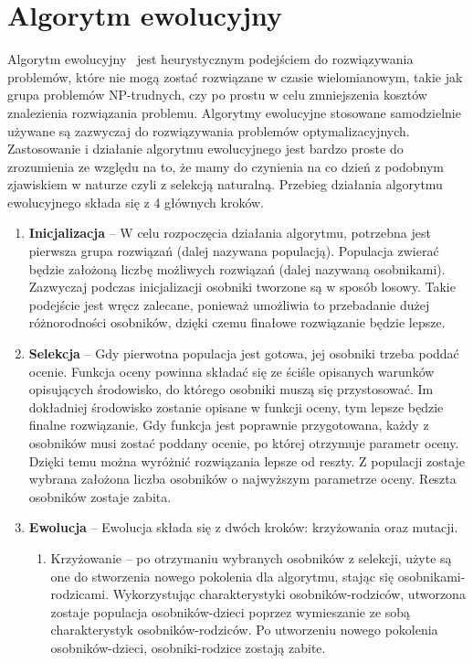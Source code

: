 \section{Algorytm ewolucyjny}
Algorytm ewolucyjny~\cite{evolution_algorithm} jest heurystycznym podejściem do rozwiązywania problemów, które nie mogą zostać rozwiązane w czasie wielomianowym, takie jak grupa problemów NP-trudnych, czy po prostu w celu zmniejszenia kosztów znalezienia rozwiązania problemu. Algorytmy ewolucyjne stosowane samodzielnie używane są zazwyczaj do rozwiązywania problemów optymalizacyjnych. Zastosowanie i działanie algorytmu ewolucyjnego jest bardzo proste do zrozumienia ze względu na to, że mamy do czynienia na co dzień z podobnym zjawiskiem w naturze czyli z selekcją naturalną. Przebieg działania algorytmu ewolucyjnego składa się z 4 głównych kroków.
	\begin{enumerate}
	\item \textbf{Inicjalizacja} -- W celu rozpoczęcia działania algorytmu, potrzebna jest pierwsza grupa rozwiązań (dalej nazywana populacją). Populacja zwierać będzie założoną liczbę możliwych rozwiązań (dalej nazywaną osobnikami). Zazwyczaj podczas inicjalizacji osobniki tworzone są w sposób losowy. Takie podejście jest wręcz zalecane, ponieważ umożliwia to przebadanie dużej różnorodności osobników, dzięki czemu finałowe rozwiązanie będzie lepsze.
	\item \textbf{Selekcja} -- Gdy pierwotna populacja jest gotowa, jej osobniki trzeba poddać ocenie. Funkcja oceny powinna składać się ze ściśle opisanych warunków opisujących środowisko, do którego osobniki muszą się przystosować. Im dokładniej środowisko zostanie opisane w funkcji oceny, tym lepsze będzie finalne rozwiązanie. Gdy funkcja jest poprawnie przygotowana, każdy z osobników musi zostać poddany ocenie, po której otrzymuje parametr oceny. Dzięki temu można wyróżnić rozwiązania lepsze od reszty. Z populacji zostaje wybrana założona liczba osobników o najwyższym parametrze oceny. Reszta osobników zostaje zabita.
	\item \textbf{Ewolucja} -- Ewolucja składa się z dwóch kroków: krzyżowania oraz mutacji. 
	\begin{enumerate}
		\item Krzyżowanie -- po otrzymaniu wybranych osobników z selekcji, użyte są one do stworzenia nowego pokolenia dla algorytmu, stając się osobnikami-rodzicami. Wykorzystując charakterystyki osobników-rodziców, utworzona zostaje populacja osobników-dzieci poprzez wymieszanie ze sobą charakterystyk osobników-rodziców. Po utworzeniu nowego pokolenia osobników-dzieci, osobniki-rodzice zostają zabite.

\end{enumerate}
\end{enumerate}

